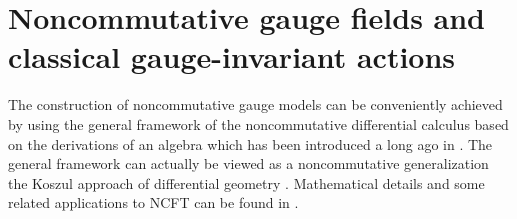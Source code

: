 \documentclass[11pt]{book}
\theoremstyle{break}
\begin{document}
\section*{Noncommutative gauge fields and classical gauge-invariant actions}


The construction of noncommutative gauge models can be conveniently achieved by using the general framework of the noncommutative differential calculus based on the derivations of an algebra which has been introduced a long ago in \cite{dubois_violette_lectures_1999}. The general framework can actually be viewed as a noncommutative generalization the Koszul approach of differential geometry \cite{koszul_lectures_1960}. Mathematical details and some related applications to NCFT can be found in \cite{wallet_derivations_2009}.
\end{document}

